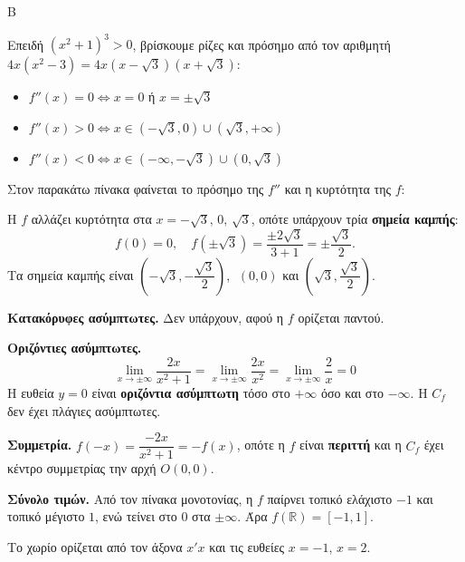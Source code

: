 \begin{thema}{Β}
\begin{erwthma}
Επειδή $(x^2+1)^3>0$, βρίσκουμε ρίζες και πρόσημο από τον αριθμητή $4x(x^2-3)=4x(x-\sqrt{3})(x+\sqrt{3})$:
\begin{itemize}
    \item $f''(x)=0\Leftrightarrow x=0$ ή $x=\pm\sqrt{3}$
    \item $f''(x)>0\Leftrightarrow x\in(-\sqrt{3},0)\cup(\sqrt{3},+\infty)$
    \item $f''(x)<0\Leftrightarrow x\in(-\infty,-\sqrt{3})\cup(0,\sqrt{3})$
\end{itemize}
Στον παρακάτω πίνακα φαίνεται το πρόσημο της $f''$ και η κυρτότητα της $f$:
\begin{center}
\end{center}
Η $f$ αλλάζει κυρτότητα στα $x=-\sqrt{3},\,0,\,\sqrt{3}$, οπότε υπάρχουν τρία \textbf{σημεία καμπής}:
\[
f(0)=0,\quad f(\pm\sqrt{3})=\frac{\pm2\sqrt{3}}{3+1}=\pm\frac{\sqrt{3}}{2}.
\]
Τα σημεία καμπής είναι $\left(-\sqrt{3},-\dfrac{\sqrt{3}}{2}\right)$, $\;(0,0)$ και $\left(\sqrt{3},\dfrac{\sqrt{3}}{2}\right)$.

\item \textbf{Κατακόρυφες ασύμπτωτες.} Δεν υπάρχουν, αφού η $f$ ορίζεται παντού.

\textbf{Οριζόντιες ασύμπτωτες.}
\[
\lim_{x\to\pm\infty}\frac{2x}{x^2+1}=\lim_{x\to\pm\infty}\frac{2x}{x^2}=\lim\limits_{x\to\pm\infty}{\dfrac{2}{x}}=0
\]
Η ευθεία $y=0$ είναι \textbf{οριζόντια ασύμπτωτη} τόσο στο $+\infty$ όσο και στο $-\infty$. Η $C_f$ δεν έχει πλάγιες ασύμπτωτες.

\textbf{Συμμετρία.} $f(-x)=\dfrac{-2x}{x^2+1}=-f(x)$, οπότε η $f$ είναι \textbf{περιττή} και η $C_f$ έχει κέντρο συμμετρίας την αρχή $O(0,0)$.

\textbf{Σύνολο τιμών.} Από τον πίνακα μονοτονίας, η $f$ παίρνει τοπικό ελάχιστο $-1$ και τοπικό μέγιστο $1$, ενώ τείνει στο $0$ στα $\pm\infty$. Άρα $f(\mathbb{R})=[-1,1]$.

\item Το χωρίο ορίζεται από τον άξονα $x'x$ και τις ευθείες $x=-1$, $x=2$.


\end{erwthma}
\end{thema}
